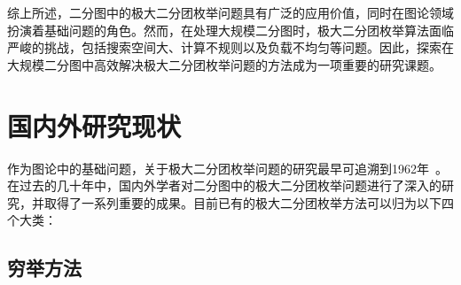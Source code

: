
综上所述，二分图中的极大二分团枚举问题具有广泛的应用价值，同时在图论领域扮演着基础问题的角色。然而，在处理大规模二分图时，极大二分团枚举算法面临严峻的挑战，包括搜索空间大、计算不规则以及负载不均匀等问题。因此，探索在大规模二分图中高效解决极大二分团枚举问题的方法成为一项重要的研究课题。



\section{国内外研究现状}
\label{sec:related}

作为图论中的基础问题，关于极大二分团枚举问题的研究最早可追溯到1962年~\cite{MBE62}。在过去的几十年中，国内外学者对二分图中的极大二分团枚举问题进行了深入的研究，并取得了一系列重要的成果。目前已有的极大二分团枚举方法可以归为以下四个大类：

\subsection{穷举方法}

